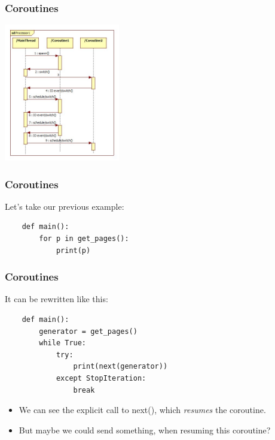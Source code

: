 \documentclass[ignorenonframetext,]{beamer}
\begin{document}
\begin{frame}[fragile]\frametitle{Coroutines}

\begin{center}
 \includegraphics[height=6cm]{img/coroutine_diagram}
\end{center}

\end{frame}

\begin{frame}[fragile]\frametitle{Coroutines}

Let's take our previous example:

\begin{verbatim}
    def main():
        for p in get_pages():
            print(p)
\end{verbatim}

\end{frame}

\begin{frame}[fragile]\frametitle{Coroutines}

It can be rewritten like this:

\begin{verbatim}
    def main():
        generator = get_pages()
        while True:
            try:
                print(next(generator))
            except StopIteration:
                break
\end{verbatim}

\begin{itemize}
\itemsep1pt\parskip0pt
\item
  We can see the explicit call to next(), which \emph{resumes} the
  coroutine.
\item
  But maybe we could send something, when resuming this coroutine?
\end{itemize}

\end{frame}
\end{document}
